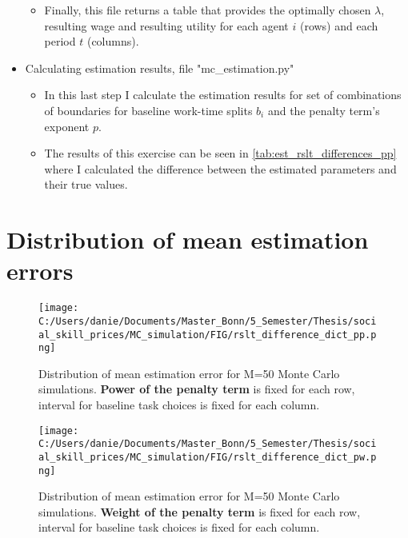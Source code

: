 \documentclass{article}
\begin{document}
\begin{appendix}
\begin{itemize}
\begin{itemize}
			\item{Finally, this file returns a table that provides the optimally chosen $\lambda$, resulting wage and resulting utility for each agent $i$ (rows) and each period $t$ (columns).}
		\end{itemize}
		\item{Calculating estimation results, file "mc\_estimation.py"}
		\begin{itemize}
			\item{In this last step I calculate the estimation results for set of combinations of boundaries for baseline work-time splits $b_i$ and the penalty term's exponent $p$.}
			\item{The results of this exercise can be seen in \ref{tab:est_rslt_differences_pp} where I calculated the difference between the estimated parameters and their true values.}
		\end{itemize}
	\end{itemize}
\section{Distribution of mean estimation errors}
\begin{figure}[ht]
\centering
	\texttt{[image: C:/Users/danie/Documents/Master\_Bonn/5\_Semester/Thesis/social\_skill\_prices/MC\_simulation/FIG/rslt\_difference\_dict\_pp.png]}
	\caption{Distribution of mean estimation error for M=50 Monte Carlo simulations. \textbf{Power of the penalty term} is fixed for each row, interval for baseline task choices is fixed for each column.}
\end{figure}

\begin{figure}[ht]
	\texttt{[image: C:/Users/danie/Documents/Master\_Bonn/5\_Semester/Thesis/social\_skill\_prices/MC\_simulation/FIG/rslt\_difference\_dict\_pw.png]}
	\caption{Distribution of mean estimation error for M=50 Monte Carlo simulations. \textbf{Weight of the penalty term} is fixed for each row, interval for baseline task choices is fixed for each column.}
\end{figure}
\end{appendix}




%

\printbibliography
\end{document}
